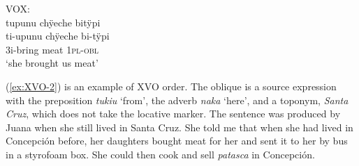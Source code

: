 \ea\label{ex:VOX-2}
\begingl
\glpreamble \textup{VOX:}\\tupunu chÿeche bitÿpi\\
\gla ti-upunu chÿeche bi-tÿpi\\
\glb 3i-bring meat 1\textsc{pl}-\textsc{obl}\\
\glft ‘she brought us meat’
\endgl
\trailingcitation{[jxx-p120515l-2.098]}
\xe


%
%

%

(\ref{ex:XVO-2}) is an example of XVO order. The oblique is a source expression with the preposition \textit{tukiu} ‘from’, the adverb \textit{naka} ‘here’, and a toponym, \textit{Santa Cruz}, which does not take the locative marker. The sentence was produced by Juana when she still lived in Santa Cruz. She told me that when she had lived in Concepción before, her daughters bought meat for her and sent it to her by bus in a styrofoam box. She could then cook and sell \textit{patasca} in Concepción.

